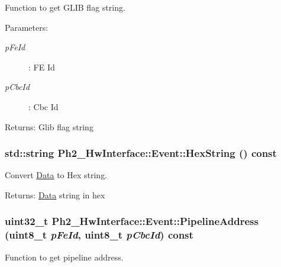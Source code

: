 Function to get GLIB flag string. 

\begin{Desc}
\item[Parameters:]
\begin{description}
\item[{\em p\-Fe\-Id}]: FE Id \item[{\em p\-Cbc\-Id}]: Cbc Id \end{description}
\end{Desc}
\begin{Desc}
\item[Returns:]Glib flag string \end{Desc}
\hypertarget{class_ph2___hw_interface_1_1_event_1dd8d9cc8a8169df80518d57b1075d2c}{
\subsubsection[HexString]{\setlength{\rightskip}{0pt plus 5cm}std::string Ph2\_\-Hw\-Interface::Event::Hex\-String () const}}
\label{class_ph2___hw_interface_1_1_event_1dd8d9cc8a8169df80518d57b1075d2c}


Convert \hyperlink{class_ph2___hw_interface_1_1_data}{Data} to Hex string. 

\begin{Desc}
\item[Returns:]\hyperlink{class_ph2___hw_interface_1_1_data}{Data} string in hex \end{Desc}
\hypertarget{class_ph2___hw_interface_1_1_event_2597189e1c09b65433df4489f5afbf56}{
\subsubsection[PipelineAddress]{\setlength{\rightskip}{0pt plus 5cm}uint32\_\-t Ph2\_\-Hw\-Interface::Event::Pipeline\-Address (uint8\_\-t {\em p\-Fe\-Id}, uint8\_\-t {\em p\-Cbc\-Id}) const}}
\label{class_ph2___hw_interface_1_1_event_2597189e1c09b65433df4489f5afbf56}


Function to get pipeline address. 

